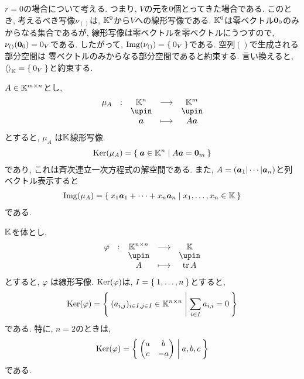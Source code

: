 \begin{remark}
$r=0$の場合について考える.
つまり,
$V$の元を$0$個とってきた場合である.
このとき,
考えるべき写像$\nu_{()}$は,
$\mathbb{K}^0$から$V$への線形写像である.
$\mathbb{K}^0$は零ベクトル$\boldsymbol{0}_0$のみからなる集合であるが,
線形写像は零ベクトルを零ベクトルにうつすので,
$\nu_{()}(\boldsymbol{0}_0)=0_V$である.
したがって, $\operatorname{Img}(\nu_{()})=\Set{0_V}$である.
空列$()$で生成される部分空間は
零ベクトルのみからなる部分空間であると約束する.
言い換えると,
$\Braket{}_{\mathbb{K}}=\Set{0_V}$と約束する.
\end{remark}

\begin{example}
  $A\in \mathbb{K}^{m\times n}$とし,
  \begin{align*}
    \shazo{\mu_A}{\KK^{n}}{\KK^{m}}
    {\aaa}{A\aaa}
  \end{align*}
  とすると, $\mu_A$
  は$\mathbb{K}$線形写像.
  \begin{align*}
    \operatorname{Ker}(\mu_A)=\Set{\boldsymbol{a}\in\mathbb{K}^n|A\boldsymbol{a}=\boldsymbol{0}_m}
  \end{align*}
  であり, これは斉次連立一次方程式の解空間である.
  また, $A=(\boldsymbol{a}_1|\cdots|\boldsymbol{a}_n)$と列ベクトル表示すると
  \begin{align*}
    \operatorname{Img}(\mu_A)=\Set{x_1\boldsymbol{a}_1+\cdots+x_n\boldsymbol{a}_n|x_1,\ldots,x_n\in \mathbb{K}}
  \end{align*}
  である.
\end{example}

\begin{example}
$\mathbb{K}$を体とし,  
  \begin{align*}
    \shazo{\varphi}{\KK^{n\times n}}{\KK}
    {A}{\tr A}
  \end{align*}
  とすると, $\varphi$
  は線形写像.
  $\operatorname{Ker}(\varphi)$は, $I=\Set{1,\dots,n}$とすると,
  \begin{align*}
    \operatorname{Ker}(\varphi)=
    \Set{(a_{i,j})_{i\in I,j\in I} \in\mathbb{K}^{n\times n}|\sum_{i\in I}a_{i,i}=0}
  \end{align*}
  である. 特に, $n=2$のときは,
  \begin{align*}
    \operatorname{Ker}(\varphi)=\Set{\begin{pmatrix}a&b\\c&-a\end{pmatrix}|a,b,c}
  \end{align*}
  である.
\end{example}

